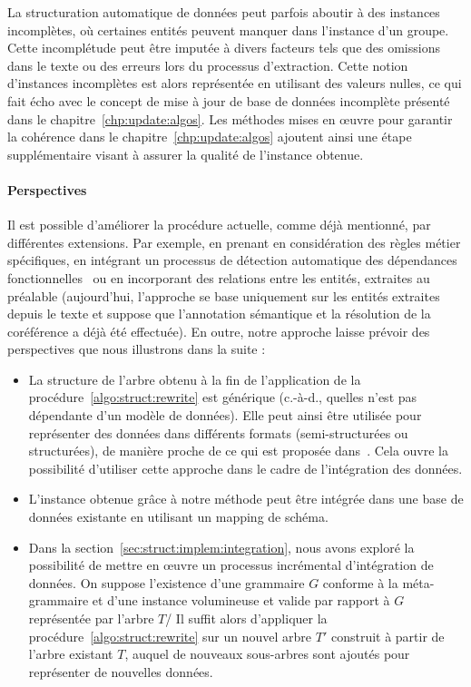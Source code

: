 La structuration automatique de données peut parfois aboutir à des instances incomplètes, où certaines entités peuvent manquer dans l'instance d'un groupe.
Cette incomplétude peut être imputée à divers facteurs tels que des omissions dans le texte ou des erreurs lors du processus d'extraction.
Cette notion d'instances incomplètes est alors représentée en utilisant des valeurs nulles, ce qui fait écho avec le concept de mise à jour de base de données incomplète présenté dans le chapitre~\ref{chp:update:algos}.
Les méthodes mises en œuvre pour garantir la cohérence dans le chapitre~\ref{chp:update:algos} ajoutent ainsi une étape supplémentaire visant à assurer la qualité de l'instance obtenue.

\paragraph{Perspectives}
Il est possible d'améliorer la procédure actuelle, comme déjà mentionné, par différentes extensions.
Par exemple, en prenant en considération des règles métier spécifiques, en intégrant un processus de détection automatique des dépendances fonctionnelles~\cite{papenbrockFunctionalDependencyDiscovery2015} ou en incorporant des relations entre les entités, extraites au préalable (aujourd'hui, l'approche se base uniquement sur les entités extraites depuis le texte et suppose que l'annotation sémantique et la résolution de la coréférence a déjà été effectuée).
En outre, notre approche laisse prévoir des perspectives que nous illustrons dans la suite :
\begin{itemize}
    \item La structure de l'arbre obtenu à la fin de l'application de la procédure~\ref{algo:struct:rewrite} est générique (c.-à-d., quelles n'est pas dépendante d'un modèle de données).
    Elle peut ainsi être utilisée pour représenter des données dans différents formats (semi-structurées ou structurées), de manière proche de ce qui est proposée dans~\cite{barretAbstraGenericAbstractions2022}.
    Cela ouvre la possibilité d'utiliser cette approche dans le cadre de l'intégration des données.

    \item L'instance obtenue grâce à notre méthode peut être intégrée dans une base de données existante en utilisant un mapping de schéma.

    \item Dans la section~\ref{sec:struct:implem:integration}, nous avons exploré la possibilité de mettre en œuvre un processus incrémental d'intégration de données.
    On suppose l'existence d'une grammaire $G$ conforme à la méta-grammaire et d'une instance volumineuse et valide par rapport à $G$ représentée par l'arbre $T$/
    Il suffit alors d'appliquer la procédure~\ref{algo:struct:rewrite} sur un nouvel arbre $T'$ construit à partir de l'arbre existant $T$, auquel de nouveaux sous-arbres sont ajoutés pour représenter de nouvelles données.
\end{itemize}
